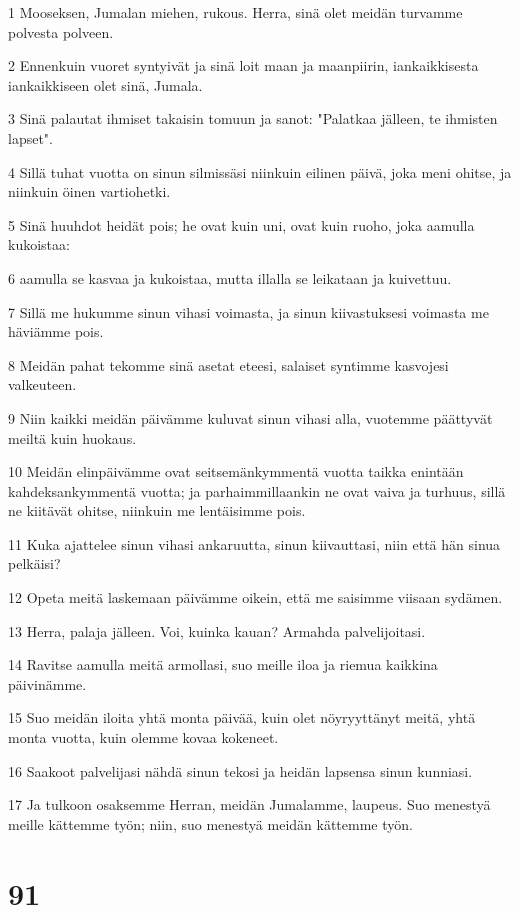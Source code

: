 \par 1 Mooseksen, Jumalan miehen, rukous. Herra, sinä olet meidän turvamme polvesta polveen.
\par 2 Ennenkuin vuoret syntyivät ja sinä loit maan ja maanpiirin, iankaikkisesta iankaikkiseen olet sinä, Jumala.
\par 3 Sinä palautat ihmiset takaisin tomuun ja sanot: "Palatkaa jälleen, te ihmisten lapset".
\par 4 Sillä tuhat vuotta on sinun silmissäsi niinkuin eilinen päivä, joka meni ohitse, ja niinkuin öinen vartiohetki.
\par 5 Sinä huuhdot heidät pois; he ovat kuin uni, ovat kuin ruoho, joka aamulla kukoistaa:
\par 6 aamulla se kasvaa ja kukoistaa, mutta illalla se leikataan ja kuivettuu.
\par 7 Sillä me hukumme sinun vihasi voimasta, ja sinun kiivastuksesi voimasta me häviämme pois.
\par 8 Meidän pahat tekomme sinä asetat eteesi, salaiset syntimme kasvojesi valkeuteen.
\par 9 Niin kaikki meidän päivämme kuluvat sinun vihasi alla, vuotemme päättyvät meiltä kuin huokaus.
\par 10 Meidän elinpäivämme ovat seitsemänkymmentä vuotta taikka enintään kahdeksankymmentä vuotta; ja parhaimmillaankin ne ovat vaiva ja turhuus, sillä ne kiitävät ohitse, niinkuin me lentäisimme pois.
\par 11 Kuka ajattelee sinun vihasi ankaruutta, sinun kiivauttasi, niin että hän sinua pelkäisi?
\par 12 Opeta meitä laskemaan päivämme oikein, että me saisimme viisaan sydämen.
\par 13 Herra, palaja jälleen. Voi, kuinka kauan? Armahda palvelijoitasi.
\par 14 Ravitse aamulla meitä armollasi, suo meille iloa ja riemua kaikkina päivinämme.
\par 15 Suo meidän iloita yhtä monta päivää, kuin olet nöyryyttänyt meitä, yhtä monta vuotta, kuin olemme kovaa kokeneet.
\par 16 Saakoot palvelijasi nähdä sinun tekosi ja heidän lapsensa sinun kunniasi.
\par 17 Ja tulkoon osaksemme Herran, meidän Jumalamme, laupeus. Suo menestyä meille kättemme työn; niin, suo menestyä meidän kättemme työn.

\chapter{91}

